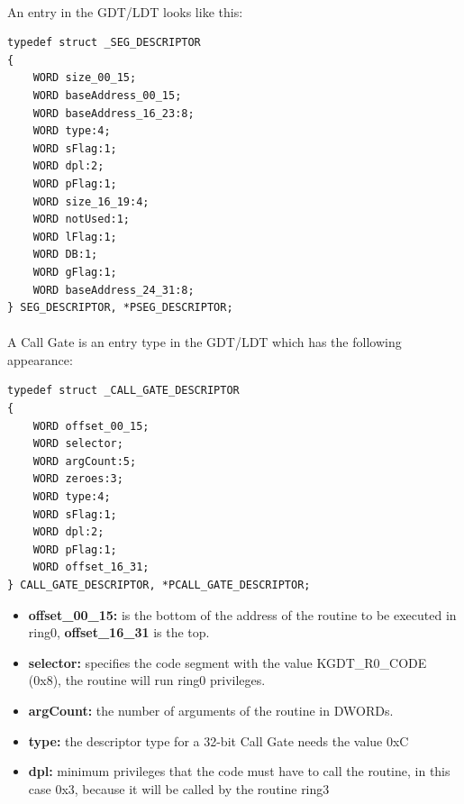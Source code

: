 \documentclass[12pt,a4paper,english]{book}
\newcommand{\paraph}{\paragraph{}}
\begin{document}
\paraph{}
An entry in the GDT/LDT looks like this:
\lstset{language=C,caption=GDT/LDT Descriptor structure}
\begin{lstlisting}
typedef struct _SEG_DESCRIPTOR
{
    WORD size_00_15;
    WORD baseAddress_00_15;
    WORD baseAddress_16_23:8;
    WORD type:4;
    WORD sFlag:1;
    WORD dpl:2;
    WORD pFlag:1;
    WORD size_16_19:4;
    WORD notUsed:1;
    WORD lFlag:1;
    WORD DB:1;
    WORD gFlag:1;
    WORD baseAddress_24_31:8;
} SEG_DESCRIPTOR, *PSEG_DESCRIPTOR;
\end{lstlisting}

\paraph{}
A Call Gate is an entry type in the GDT/LDT which has the following appearance:
\lstset{language=C,caption=Call Gate Descriptor structure}
\begin{lstlisting}
typedef struct _CALL_GATE_DESCRIPTOR
{
    WORD offset_00_15;
    WORD selector;
    WORD argCount:5;
    WORD zeroes:3;
    WORD type:4;
    WORD sFlag:1;
    WORD dpl:2;
    WORD pFlag:1;
    WORD offset_16_31;
} CALL_GATE_DESCRIPTOR, *PCALL_GATE_DESCRIPTOR;
\end{lstlisting}

\begin{itemize}
\item {{\bf offset\_00\_15:} is the bottom of the address of the routine to be executed in ring0, {\bf offset\_16\_31} is the top.}
\item {{\bf selector:} specifies the code segment with the value KGDT\_R0\_CODE (0x8), the routine will run ring0 privileges.}
\item {{\bf argCount:} the number of arguments of the routine in DWORDs.}
\item {{\bf type:} the descriptor type for a 32-bit Call Gate needs the value 0xC}
\item {{\bf dpl:} minimum privileges that the code must have to call the routine, in this case 0x3, because it will be called by the routine ring3}
\end{itemize}
\end{document}
